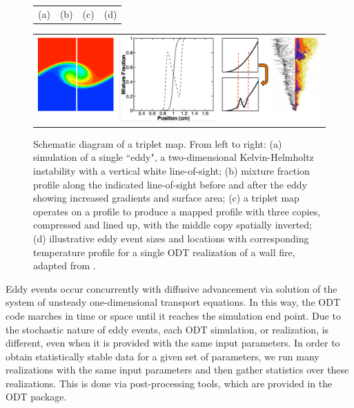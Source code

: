 \documentclass[preprint,12pt, a4paper]{elsarticle}
\begin{document}
\begin{figure}
		\begin{tabular}{llll}
			\hspace{40pt}(a) & \hspace{100pt} (b) & \hspace{70pt} (c) & \hspace{50pt}(d) 
		\end{tabular}
	\begin{center}
		\begin{tabular}{c}
            \includegraphics[width=\textwidth]{fig_tripmap.pdf} 
		\end{tabular}
	\end{center}
    \caption{Schematic diagram of a triplet map. From left to right: (a) simulation of a single ``eddy", a two-dimensional Kelvin-Helmholtz instability with a vertical white line-of-sight; (b) mixture fraction profile along the indicated line-of-sight before and after the eddy showing increased gradients and surface area; (c) a triplet map operates on a profile to produce a mapped profile with three copies, compressed and lined up, with the middle copy spatially inverted; (d) illustrative eddy event sizes and locations with corresponding temperature profile for a single ODT realization of a wall fire, adapted from \cite{Monson_2016}.}
\label{fig:tripletmap}
\end{figure}

Eddy events occur concurrently with diffusive advancement via solution of the system of unsteady one-dimensional transport equations. In this way, the ODT code marches in time or space until it reaches the simulation end point. Due to the stochastic nature of eddy events, each ODT simulation, or realization, is different, even when it is provided with the same input parameters. In order to obtain statistically stable data for a given set of parameters, we run many realizations with the same input parameters and then gather statistics over these realizations. This is done via post-processing tools, which are provided in the ODT package. 

\end{document}
